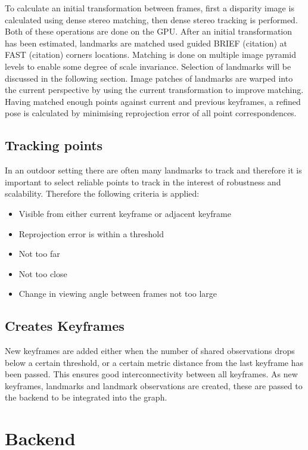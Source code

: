 To calculate an initial transformation between frames, first a disparity image is calculated using dense stereo matching, then dense stereo tracking is performed.  Both of these operations are done on the GPU.  After an initial transformation has been estimated, landmarks are matched used guided BRIEF (citation) at FAST (citation) corners locations.  Matching is done on multiple image pyramid levels to enable some degree of scale invariance. Selection of landmarks will be discussed in the following section.  Image patches of landmarks are warped into the current perspective by using the current transformation to improve matching. Having matched enough points against current and previous keyframes, a refined pose is calculated by minimising reprojection error of all point correspondences.

\subsection{Tracking points}

In an outdoor setting there are often many landmarks to track and therefore it is important to select reliable points to track in the interest of robustness and scalability.  Therefore the following criteria is applied:
\begin{itemize}
 \setlength{\itemsep}{0cm}%
 \setlength{\parskip}{0cm}%
 \item Visible from either current keyframe or adjacent keyframe
 \item Reprojection error is within a threshold
 \item Not too far
 \item Not too close
 \item Change in viewing angle between frames not too large
\end{itemize}

\subsection{Creates Keyframes}

New keyframes are added either when the number of shared observations drops below a certain threshold, or a certain metric distance from the last keyframe has been passed.  This ensures good interconnectivity between all keyframes.  As new keyframes, landmarks and landmark observations are created, these are passed to the backend to be integrated into the graph.

\section{Backend}
\label{sec:scavislam_backend}

